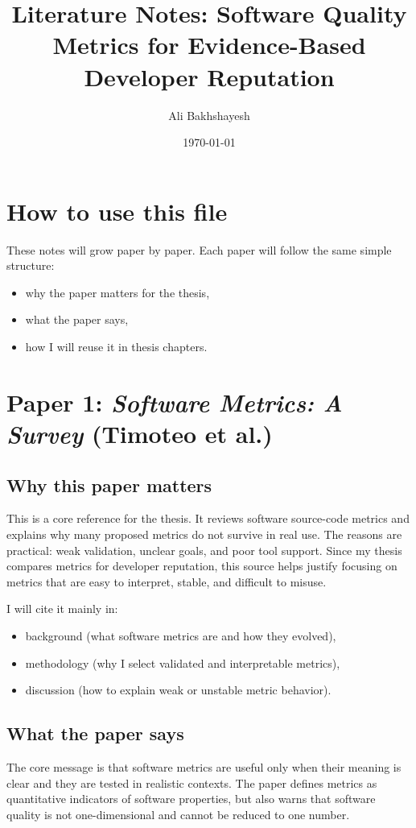 \documentclass[11pt,a4paper]{article}
\title{Literature Notes: Software Quality Metrics for Evidence-Based Developer Reputation}
\author{Ali Bakhshayesh}
\date{\today}
\begin{document}
\maketitle

\section*{How to use this file}
These notes will grow paper by paper.
Each paper will follow the same simple structure:
\begin{itemize}[leftmargin=*]
  \item why the paper matters for the thesis,
  \item what the paper says,
  \item how I will reuse it in thesis chapters.
\end{itemize}

\tableofcontents
\newpage

\section{Paper 1: \textit{Software Metrics: A Survey} (Timoteo et al.)}

\subsection{Why this paper matters}
This is a core reference for the thesis. It reviews software source-code metrics and explains why many proposed metrics do not survive in real use. The reasons are practical: weak validation, unclear goals, and poor tool support. Since my thesis compares metrics for developer reputation, this source helps justify focusing on metrics that are easy to interpret, stable, and difficult to misuse.

I will cite it mainly in:
\begin{itemize}[leftmargin=*]
  \item background (what software metrics are and how they evolved),
  \item methodology (why I select validated and interpretable metrics),
  \item discussion (how to explain weak or unstable metric behavior).
\end{itemize}

\subsection{What the paper says}
The core message is that software metrics are useful only when their meaning is clear and they are tested in realistic contexts. The paper defines metrics as quantitative indicators of software properties, but also warns that software quality is not one-dimensional and cannot be reduced to one number.
\end{document}
